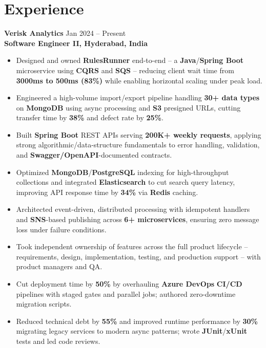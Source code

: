 \documentclass[a4paper,10pt]{article}
\begin{document}
\section*{Experience}

\textbf{Verisk Analytics} \hfill Jan 2024 -- Present \\
\textbf{Software Engineer II, Hyderabad, India}

\begin{itemize}[leftmargin=*]
    \item Designed and owned \textbf{RulesRunner} end-to-end -- a \textbf{Java}/\textbf{Spring Boot} microservice using \textbf{CQRS} and \textbf{SQS} -- reducing client wait time from \textbf{3000ms to 500ms (83\%)} while enabling horizontal scaling under peak load.
    \item Engineered a high-volume import/export pipeline handling \textbf{30+ data types} on \textbf{MongoDB} using async processing and \textbf{S3} presigned URLs, cutting transfer time by \textbf{38\%} and defect rate by \textbf{25\%}.
    \item Built \textbf{Spring Boot} REST APIs serving \textbf{200K+ weekly requests}, applying strong algorithmic/data-structure fundamentals to error handling, validation, and \textbf{Swagger/OpenAPI}-documented contracts.
    \item Optimized \textbf{MongoDB}/\textbf{PostgreSQL} indexing for high-throughput collections and integrated \textbf{Elasticsearch} to cut search query latency, improving API response time by \textbf{34\%} via \textbf{Redis} caching.
    \item Architected event-driven, distributed processing with idempotent handlers and \textbf{SNS}-based publishing across \textbf{6+ microservices}, ensuring zero message loss under failure conditions.
    \item Took independent ownership of features across the full product lifecycle -- requirements, design, implementation, testing, and production support -- with product managers and QA.
    \item Cut deployment time by \textbf{50\%} by overhauling \textbf{Azure DevOps} \textbf{CI/CD} pipelines with staged gates and parallel jobs; authored zero-downtime migration scripts.
    \item Reduced technical debt by \textbf{55\%} and improved runtime performance by \textbf{30\%} migrating legacy services to modern async patterns; wrote \textbf{JUnit}/\textbf{xUnit} tests and led code reviews.
\end{itemize}
\end{document}
